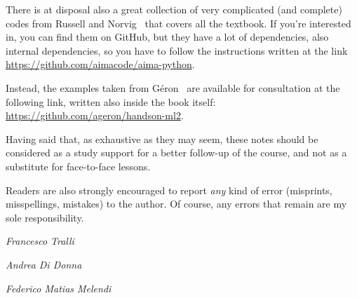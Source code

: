 \documentclass[11pt,openany,twoside,a4paper]{book}
\numberwithin{equation}{section}		%
\begin{document}
{There is at disposal also a great collection of very complicated (and complete) codes from Russell and Norvig~\cite{RussellNorvig3} that covers all the textbook. If you're interested in, you can find them on GitHub, but they have a lot of dependencies, also internal dependencies, so you have to follow the instructions written at the link \url{https://github.com/aimacode/aima-python}.

Instead, the examples taken from Géron~\cite{Geron1,Geron2} are available for consultation at the following link, written also inside the book itself: \url{https://github.com/ageron/handson-ml2}.

Having said that, as exhaustive as they may seem, these notes should be considered as a study support for a better follow-up of the course, and not as a substitute for face-to-face lessons.


Readers are also strongly encouraged to report \emph{any} kind of error (misprints, misspellings, mistakes) to the author. Of course, any errors that remain are my sole responsibility.



\vspace{1cm}
\hspace*{9.5cm}\emph{Francesco Tralli}\par
\hspace*{9.5cm}\emph{Andrea Di Donna}\par
\hspace*{9.5cm}\emph{Federico Matias Melendi}

\vspace{1cm}
{\centering{}\par}
}



\mainmatter




\titlespacing*{\chapter}{0pt}{50pt}{30pt}
\end{document}
